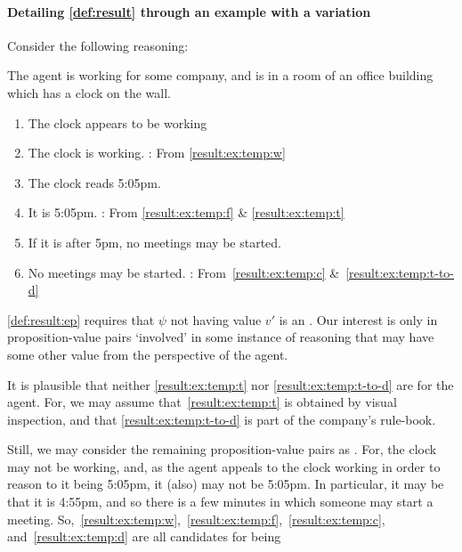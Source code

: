 \paragraph*{Detailing \autoref{def:result} through an example with a variation}

\begin{note}
  Consider the following reasoning:
  \begin{example}\mbox{}
    The agent is working for some company, and is in a room of an office building which has a clock on the wall.
    \begin{enumerate}[label=\arabic*., ref=(\arabic*)]
    \item\label{result:ex:temp:w} The clock appears to be working
    \item\label{result:ex:temp:f} The clock is working. \hfill \CStepA{}: From \ref{result:ex:temp:w}
    \item\label{result:ex:temp:t} The clock reads 5:05pm.
    \item\label{result:ex:temp:c} It is 5:05pm. \hfill \CStepB{}: From \ref{result:ex:temp:f} \& \ref{result:ex:temp:t}
    \item\label{result:ex:temp:t-to-d} If it is after 5pm, no meetings may be started.
    \item\label{result:ex:temp:d} No meetings may be started.
      \hfill \CStepC{}: From~\ref{result:ex:temp:c} \&~\ref{result:ex:temp:t-to-d}
    \end{enumerate}
  \end{example}

  \ref{def:result:ep} requires that \(\psi\) not having value \(v'\) is an \ep{}.
  Our interest is only in proposition-value pairs `involved' in some instance of reasoning that may have some other value from the perspective of the agent.

  It is plausible that neither \ref{result:ex:temp:t} nor \ref{result:ex:temp:t-to-d} are  for the agent.
  For, we may assume that~\ref{result:ex:temp:t} is obtained by visual inspection, and that \ref{result:ex:temp:t-to-d} is part of the company's rule-book.

  Still, we may consider the remaining proposition-value pairs as \ep{}.
  For, the clock may not be working, and, as the agent appeals to the clock working in order to reason to it being 5:05pm, it (also) may not be 5:05pm.
  In particular, it may be that it is 4:55pm, and so there is a few minutes in which someone may start a meeting.
  So,~\ref{result:ex:temp:w},~\ref{result:ex:temp:f},~\ref{result:ex:temp:c}, and~\ref{result:ex:temp:d} are all candidates for being 
\end{note}

